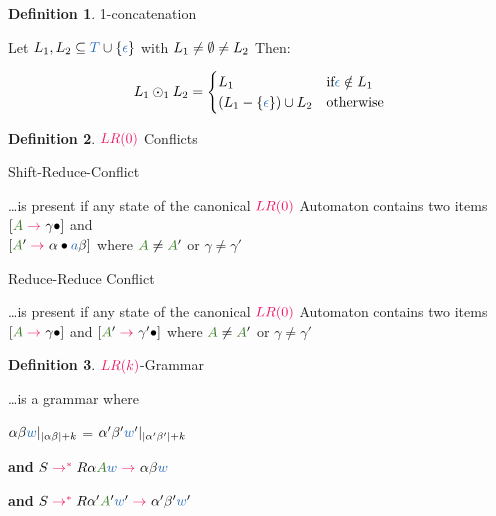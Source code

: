 \documentclass[10pt, landscape]{article}
\theoremstyle{definition}
\newtheorem{definition}{Definition}[section]
\newcommand{\Op}[1]{\textcolor{WildStrawberry}{#1}}
\newcommand{\OneConcat}{\odot_{1}}
\newcommand{\derive}[1][]{\Op{\;\rightarrow_{#1}\;}}
\newcommand{\derives}[1][]{\Op{\;\rightarrow_{#1}^{*}\;}}
\newcommand{\nontermcolor}{OliveGreen}
\newcommand{\nt}[1]{\textcolor{\nontermcolor}{#1}}
\newcommand{\ntA}{\nt{A}}
\newcommand{\termcolor}{NavyBlue}
\newcommand{\terms}{\textcolor{\termcolor}{T}}
\newcommand{\termW}{\textcolor{\termcolor}{w}}
\newcommand{\termA}{\textcolor{\termcolor}{a}}
\newcommand{\termEps}{\textcolor{\termcolor}{\epsilon}}
\newcommand{\prodcolor}{WildStrawberry}
\newcommand{\LRZero}{\textcolor{\prodcolor}{LR (0)}}
\newcommand{\LRk}{\textcolor{\prodcolor}{LR (k)}}
\begin{document}
\begin{multicols*}{3}
\begin{definition}{1-concatenation}
{    Let $\Lang{1}, \Lang{2} \subseteq \terms \cup \{ \termEps \}$ with $L_{1} \neq \emptyset \neq L_{2}$ Then:

    \[
      \Lang{1} \OneConcat \Lang{2} = \begin{cases}
                                       \Lang{1} & \text{if} \termEps \notin \Lang{1} \\
                                       (\Lang{1} - \{\termEps\}) \cup \Lang{2}  & \text{otherwise}
                                     \end{cases}
                                   \]


  }
\end{definition}

\begin{definition}{$\LRZero$ Conflicts}

  \begin{compactenum}
    \item Shift-Reduce-Conflict

          \dots is present if any state of the canonical $\LRZero$ Automaton contains two items
          $[\ntA \derive \gamma \bullet]$ and \\ $[\ntA' \derive \alpha \bullet \termA \beta]$
          where $\ntA \neq \ntA'$ or $\gamma \neq \gamma'$

    \item Reduce-Reduce Conflict

          \dots is present if any state of the canonical $\LRZero$ Automaton contains two items
          $[\ntA \derive \gamma \bullet]$ and $[\ntA' \derive \gamma' \bullet]$
          where $\ntA \neq \ntA'$ or $\gamma \neq \gamma'$

  \end{compactenum}

\end{definition}


\begin{definition}{$\LRk$-Grammar}

  \dots is a grammar where

  \begin{compactenum}
    \item $\alpha\beta\termW |_{|\alpha\beta|+k}$ = $\alpha'\beta'\termW' |_{|\alpha'\beta'|+k}$
    \item \textbf{and} $S \derives{R} \alpha \ntA \termW \derive \alpha \beta \termW$
    \item \textbf{and} $S \derives{R} \alpha' \ntA' \termW' \derive \alpha' \beta' \termW'$
  \end{compactenum}


\end{definition}
\end{multicols*}
\end{document}
